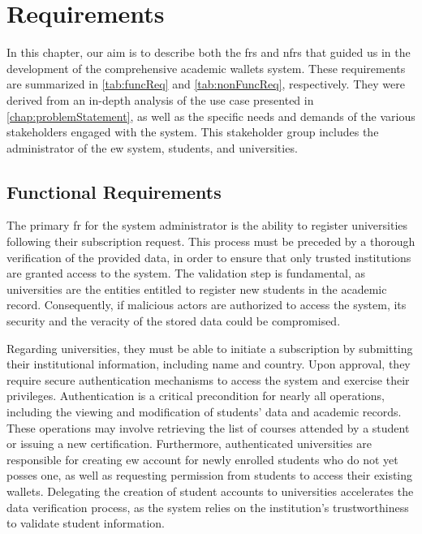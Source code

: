 \chapter{Requirements}
\label{chap:requirements}
In this chapter, our aim is to describe both the \glspl{fr} and \glspl{nfr} that guided us in the development of the comprehensive academic wallets system. These requirements are summarized in \cref{tab:funcReq} and \cref{tab:nonFuncReq}, respectively. They were derived from an in-depth analysis of the use case presented in \cref{chap:problemStatement}, as well as the specific needs and demands of the various stakeholders engaged with the system. This stakeholder group includes the administrator of the \gls{ew} system, students, and universities.



\section{Functional Requirements}
\label{sec:functionalRequirements}
The primary \gls{fr} for the system administrator is the ability to register universities following their subscription request. This process must be preceded by a thorough verification of the provided data, in order to ensure that only trusted institutions are granted access to the system. The validation step is fundamental, as universities are the entities entitled to register new students in the academic record. Consequently, if malicious actors are authorized to access the system, its security and the veracity of the stored data could be compromised.

Regarding universities, they must be able to initiate a subscription by submitting their institutional information, including name and country. Upon approval, they require secure authentication mechanisms to access the system and exercise their privileges. Authentication is a critical precondition for nearly all operations, including the viewing and modification of students' data and academic records. These operations may involve retrieving the list of courses attended by a student or issuing a new certification. Furthermore, authenticated universities are responsible for creating \gls{ew} account for newly enrolled students who do not yet posses one, as well as requesting permission from students to access their existing wallets. Delegating the creation of student accounts to universities accelerates the data verification process, as the system relies on the institution's trustworthiness to validate student information. 

